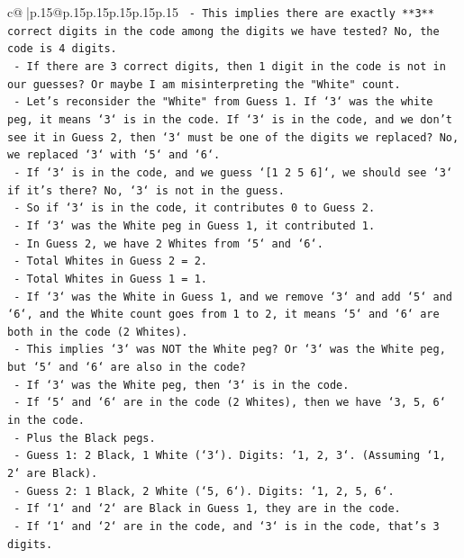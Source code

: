 \documentclass{article}
\begin{document}
{\begin{supertabular}{c@{$\;$}|p{.15\linewidth}@{}p{.15\linewidth}p{.15\linewidth}p{.15\linewidth}p{.15\linewidth}p{.15\linewidth}}
{{{\texttt{    {-}   This implies there are exactly **3** correct digits in the code among the digits we have tested? No, the code is 4 digits.} \\
\texttt{    {-}   If there are 3 correct digits, then 1 digit in the code is not in our guesses? Or maybe I am misinterpreting the "White" count.} \\
\texttt{    {-}   Let's reconsider the "White" from Guess 1. If `3` was the white peg, it means `3` is in the code. If `3` is in the code, and we don't see it in Guess 2, then `3` must be one of the digits we replaced? No, we replaced `3` with `5` and `6`.} \\
\texttt{    {-}   If `3` is in the code, and we guess `{[}1 2 5 6{]}`, we should see `3` if it's there? No, `3` is not in the guess.} \\
\texttt{    {-}   So if `3` is in the code, it contributes 0 to Guess 2.} \\
\texttt{    {-}   If `3` was the White peg in Guess 1, it contributed 1.} \\
\texttt{    {-}   In Guess 2, we have 2 Whites from `5` and `6`.} \\
\texttt{    {-}   Total Whites in Guess 2 = 2.} \\
\texttt{    {-}   Total Whites in Guess 1 = 1.} \\
\texttt{    {-}   If `3` was the White in Guess 1, and we remove `3` and add `5` and `6`, and the White count goes from 1 to 2, it means `5` and `6` are both in the code (2 Whites).} \\
\texttt{    {-}   This implies `3` was NOT the White peg? Or `3` was the White peg, but `5` and `6` are also in the code?} \\
\texttt{    {-}   If `3` was the White peg, then `3` is in the code.} \\
\texttt{    {-}   If `5` and `6` are in the code (2 Whites), then we have `3, 5, 6` in the code.} \\
\texttt{    {-}   Plus the Black pegs.} \\
\texttt{    {-}   Guess 1: 2 Black, 1 White (`3`). Digits: `1, 2, 3`. (Assuming `1, 2` are Black).} \\
\texttt{    {-}   Guess 2: 1 Black, 2 White (`5, 6`). Digits: `1, 2, 5, 6`.} \\
\texttt{    {-}   If `1` and `2` are Black in Guess 1, they are in the code.} \\
\texttt{    {-}   If `1` and `2` are in the code, and `3` is in the code, that's 3 digits.} \\
}}}
\end{supertabular}}
\end{document}
